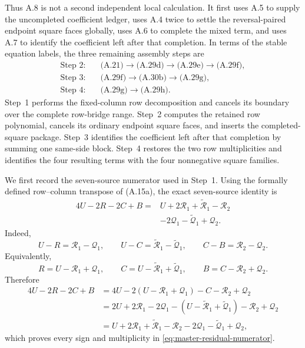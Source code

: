 \documentclass[11pt]{article}
\begin{document}
Thus A.8 is not a second independent local calculation.  It first uses A.5
to supply the uncompleted coefficient ledger, uses A.4 twice to settle the
reversal-paired endpoint square faces globally, uses A.6 to complete the
mixed term, and uses A.7 to identify the coefficient left after that
completion.  In terms of the
stable equation labels, the three remaining assembly steps are
\[
\begin{aligned}
\text{Step 2:}\quad&
\text{(A.21)}
\longrightarrow\text{(A.29d)}
\longrightarrow\text{(A.29e)}
\longrightarrow\text{(A.29f)},\\
\text{Step 3:}\quad&
\text{(A.29f)}
\longrightarrow\text{(A.30b)}
\longrightarrow\text{(A.29g)},\\
\text{Step 4:}\quad&
\text{(A.29g)}
\longrightarrow\text{(A.29h)}.
\end{aligned}
\]
Step~1 performs the fixed-column row decomposition and cancels its boundary
over the complete row-bridge range.  Step~2 computes the retained row
polynomial, cancels its ordinary endpoint square faces, and inserts the
completed-square package.  Step~3 identifies the coefficient left after that
completion by summing one same-side block.  Step~4 restores the two row
multiplicities and identifies the four resulting terms with the four
nonnegative square families.

We first record the seven-source numerator used in Step~1.
Using the formally defined row--column transpose of (A.15a), the exact
seven-source identity is
\begin{equation}\label{eq:master-residual-numerator}
\begin{aligned}
4U-2R-2C+B
={}&U+2\mathcal R_1+\widetilde{\mathcal R}_1-\mathcal R_2\\
&-2\mathcal Q_1-\widetilde{\mathcal Q}_1+\mathcal Q_2.
\end{aligned}
\tag{A.29a}
\end{equation}
Indeed,
\[
U-R=\mathcal R_1-\mathcal Q_1,
\qquad
U-C=\widetilde{\mathcal R}_1-\widetilde{\mathcal Q}_1,
\qquad
C-B=\mathcal R_2-\mathcal Q_2.
\]
Equivalently,
\[
R=U-\mathcal R_1+\mathcal Q_1,\qquad
C=U-\widetilde{\mathcal R}_1+\widetilde{\mathcal Q}_1,\qquad
B=C-\mathcal R_2+\mathcal Q_2.
\]
Therefore
\[
\begin{aligned}
4U-2R-2C+B
&=4U-2(U-\mathcal R_1+\mathcal Q_1)-C-\mathcal R_2+\mathcal Q_2\\
&=2U+2\mathcal R_1-2\mathcal Q_1
 -(U-\widetilde{\mathcal R}_1+\widetilde{\mathcal Q}_1)
 -\mathcal R_2+\mathcal Q_2\\
&=U+2\mathcal R_1+\widetilde{\mathcal R}_1-\mathcal R_2
 -2\mathcal Q_1-\widetilde{\mathcal Q}_1+\mathcal Q_2,
\end{aligned}
\]
which proves every sign and multiplicity in \eqref{eq:master-residual-numerator}.
\end{document}
